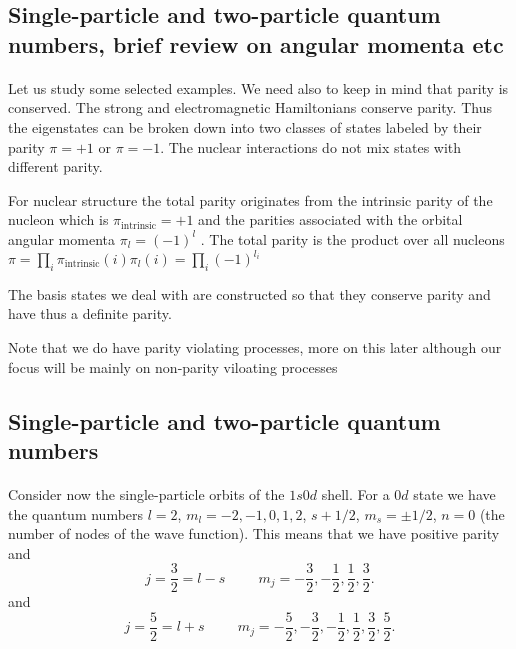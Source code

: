 \documentclass[%
twoside,                 %
final,                   %
10pt]{article}
\begin{document}
\subsection*{Single-particle and two-particle quantum numbers, brief review on angular momenta etc}

\paragraph{}
Let us study some selected examples. We need also to keep in mind that parity is conserved.
The strong and electromagnetic Hamiltonians conserve parity. Thus the eigenstates can be
broken down into two classes of states labeled by their parity $\pi= +1$ or $\pi=-1$.
The nuclear interactions do not mix states with different parity.

For nuclear structure the total parity originates
from the intrinsic parity of the nucleon which is $\pi_{\mathrm{intrinsic}}=+1$ 
and the parities associated with
the orbital angular momenta $\pi_l=(-1)^l$ . The total parity is the product over all nucleons
$\pi = \prod_i \pi_{\mathrm{intrinsic}}(i)\pi_l(i) = \prod_i (-1)^{l_i}$

The basis states we deal with are constructed so that they conserve parity and have thus a definite parity. 

Note that we do have parity violating processes, more on this later although our focus will be mainly on non-parity viloating processes




\subsection*{Single-particle and two-particle quantum numbers}

\paragraph{}

Consider now the single-particle orbits of the $1s0d$ shell. 
For a $0d$ state we have the quantum numbers $l=2$, $m_l=-2,-1,0,1,2$, $s+1/2$, $m_s=\pm 1/2$,
$n=0$ (the number of nodes of the wave function).   This means that we have positive parity and
\[
j=\frac{3}{2}=l-s\hspace{1cm} m_j=-\frac{3}{2},-\frac{1}{2},\frac{1}{2},\frac{3}{2}.
\]
and
\[
j=\frac{5}{2}=l+s\hspace{1cm} m_j=-\frac{5}{2},-\frac{3}{2},-\frac{1}{2},\frac{1}{2},\frac{3}{2},\frac{5}{2}.
\]
\end{document}
